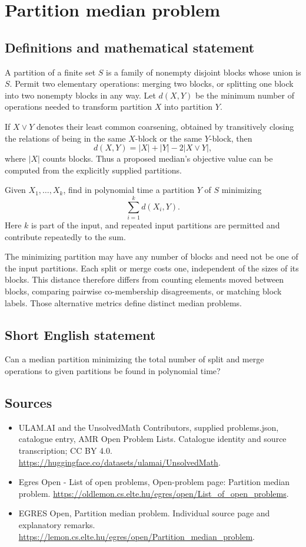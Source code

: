 \documentclass[11pt,a4paper]{article}
\begin{document}
\section*{Partition median problem}\label{statement}

\subsection{Definitions and mathematical statement}
A partition of a finite set $S$ is a family of nonempty disjoint
blocks whose union is $S$. Permit two elementary operations:
merging two blocks, or splitting one block into two nonempty blocks
in any way. Let $d(X,Y)$ be the minimum number of operations needed
to transform partition $X$ into partition $Y$.

If $X\vee Y$ denotes their least common coarsening, obtained by
transitively closing the relations of being in the same $X$-block
or the same $Y$-block, then
\[
                     d(X,Y)=|X|+|Y|-2|X\vee Y|,
\]
where $|X|$ counts blocks. Thus a proposed median's objective value
can be computed from the explicitly supplied partitions.

Given $X_1,\ldots,X_k$, find in polynomial time a partition $Y$ of
$S$ minimizing
\[
                               \sum_{i=1}^k d(X_i,Y).
\]
Here $k$ is part of the input, and repeated input partitions are
permitted and contribute repeatedly to the sum.

The minimizing partition may have any number of blocks and need
not be one of the input partitions. Each split or merge costs one,
independent of the sizes of its blocks. This distance therefore
differs from counting elements moved between blocks, comparing
pairwise co-membership disagreements, or matching block labels.
Those alternative metrics define distinct median problems.
\subsection{Short English statement}
Can a median partition minimizing the total number of split
and merge operations to given partitions be found in polynomial time?
\subsection{Sources}
\begin{itemize}
\item[S1] ULAM.AI and the UnsolvedMath Contributors, supplied problems.json, catalogue entry, AMR Open Problem Lists. Catalogue identity and source transcription; CC BY 4.0.
\url{https://huggingface.co/datasets/ulamai/UnsolvedMath}.
\item[S2] Egres Open - List of open problems, Open-problem page: Partition median problem. 
\url{https://oldlemon.cs.elte.hu/egres/open/List_of_open_problems}.
\item[S3] EGRES Open, Partition median problem. Individual source page and explanatory remarks.
\url{https://lemon.cs.elte.hu/egres/open/Partition_median_problem}.
\end{itemize}
\end{document}
